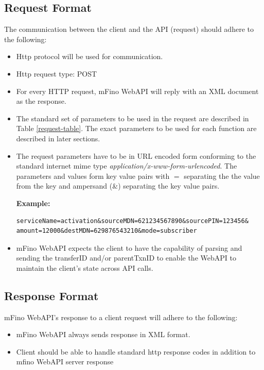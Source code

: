 \documentclass[11pt,titlepage]{article}
\begin{document}
\subsection{Request Format}
The communication between the client and the API (request) should adhere to the following:
\begin{itemize}
\item Http protocol will be used for communication.
\item Http request type: POST
\item For every HTTP request, mFino WebAPI will reply with an XML document as the response.
\item The standard set of parameters to be used in the request are described in Table \ref{request-table}. The exact parameters to be used for each function are described in later sections. 
\item The request parameters have to be in URL encoded form conforming to the standard internet mime type \textit{application/x-www-form-urlencoded}. The parameters and values form key value pairs with $=$ separating the  the value from the key and ampersand (\&) separating the key value pairs. 

\textbf{Example:}
\begin{verbatim}
serviceName=activation&sourceMDN=621234567890&sourcePIN=123456&
amount=12000&destMDN=629876543210&mode=subscriber
\end{verbatim}
\item mFino WebAPI expects the client to have the capability of parsing and sending the transferID and/or parentTxnID to enable the WebAPI to maintain the client's state across API calls.
\end{itemize}

\subsection{Response Format}
mFino WebAPI's response to a client request will adhere to the following:
\begin{itemize}
\item mFino WebAPI always sends response in XML format.
\item Client should be able to handle standard http response codes in addition to mfino WebAPI server response 
\end{itemize}
\end{document}

